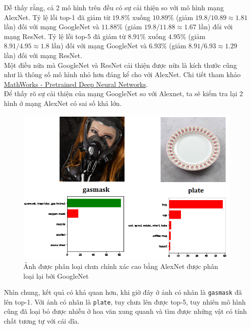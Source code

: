 \documentclass[a4paper]{article}
\begin{document}
\noindent
Dễ thấy rằng, cả 2 mô hình trên đều có sự cải thiện so với mô hình mạng AlexNet. Tỷ lệ lỗi top-1 đã giảm từ $19.8\%$ xuống $10.89\%$ (giảm $19.8/10.89 \approx 1.81$ lần) đối với mạng GoogleNet và $11.88\%$ (giảm $19.8/11.88 \approx 1.67$ lần) đối với mạng ResNet. Tỷ lệ lỗi top-5 đã giảm từ $8.91\%$ xuống $4.95\%$ (giảm $8.91/4.95 \approx 1.8$ lần) đối với mạng GoogleNet và $6.93\%$ (giảm $8.91/6.93 \approx 1.29$ lần) đối với mạng ResNet.\\
Một điều nữa mà GoogleNet và ResNet cải thiện được nữa là kích thước cũng như là thông số mô hình nhỏ hơn đáng kể cho với AlexNet. Chi tiết tham khảo \href{https://www.mathworks.com/help/deeplearning/ug/pretrained-convolutional-neural-networks.html}{MathWorks - Pretrained Deep Neural Networks}.\\
Để thấy rõ sự cải thiện của mạng GoogleNet so với Alexnet, ta sẽ kiểm tra lại 2 hình ở mạng AlexNet có sai số khá lớn.
\begin{figure}[h!]
\centering
\includegraphics[width=15cm]{images/res3.PNG}
\caption*{Ảnh được phân loại chưa chính xác cao bằng AlexNet được phân loại lại bởi GoogleNet}
\end{figure}

\noindent
Nhìn chung, kết quả có khả quan hơn, khi giờ đây ở ảnh có nhãn là \texttt{gasmask} đã lên top-1. Với ảnh có nhãn là \texttt{plate}, tuy chưa lên được top-5, tuy nhiên mô hình cũng đã loại bỏ được nhiễu ở hoa văn xung quanh và tìm được những vật có tính chất tương tự với cái dĩa.
\end{document}
